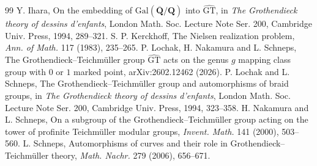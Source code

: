 \documentclass[11pt,a4paper]{article}
\theoremstyle{plain}
\theoremstyle{definition}
\theoremstyle{remark}
\newcommand{\GT}{\widehat{\mathrm{GT}}}
\begin{document}
\begin{thebibliography}{99}
 Y. Ihara, On the embedding of $\mathrm{Gal}(\overline{\mathbf Q}/\mathbf Q)$ into $\GT$, in \emph{The
Grothendieck theory of dessins d'enfants}, London Math. Soc. Lecture Note Ser. 200, Cambridge Univ. Press, 1994,
289--321.
 S. P. Kerckhoff, The Nielsen realization problem, \emph{Ann. of Math.} 117 (1983), 235--265.
 P. Lochak, H. Nakamura and L. Schneps, The Grothendieck--Teichm\"uller group $\GT$ acts on the genus
$g$ mapping class group with $0$ or $1$ marked point, arXiv:2602.12462 (2026).
 P. Lochak and L. Schneps, The Grothendieck--Teichm\"uller group and automorphisms of braid groups, in
\emph{The Grothendieck theory of dessins d'enfants}, London Math. Soc. Lecture Note Ser. 200, Cambridge Univ.
Press, 1994, 323--358.
 H. Nakamura and L. Schneps, On a subgroup of the Grothendieck--Teichm\"uller group acting on the
tower of profinite Teichm\"uller modular groups, \emph{Invent. Math.} 141 (2000), 503--560.
 L. Schneps, Automorphisms of curves and their role in Grothendieck--Teichm\"uller theory, \emph{Math.
Nachr.} 279 (2006), 656--671.
\end{thebibliography}
\end{document}
